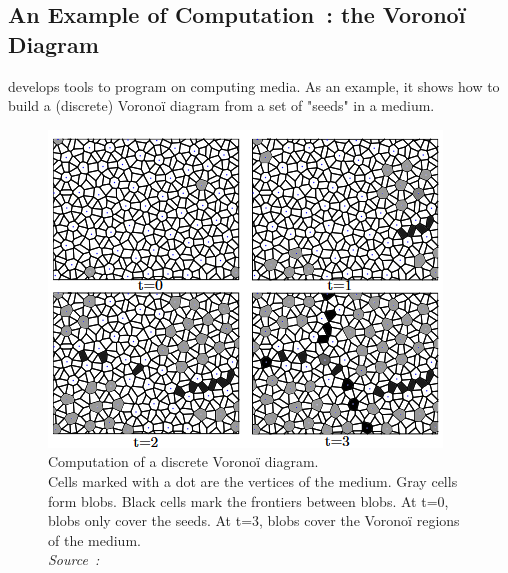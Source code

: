 \documentclass{article}
\begin{document}
\subsection{An Example of Computation~: the Voronoï Diagram}

\cite{Voronoi} develops tools to program on computing media. As an example, it shows how to build a (discrete) Voronoï diagram from a set of "seeds" in a medium.

\begin{figure}[h]
	\centering\includegraphics[width=0.7\linewidth]{assets/voronoi_spread.png}
	\caption{
		Computation of a discrete Voronoï diagram.\\
		Cells marked with a dot are the vertices of the medium.
		Gray cells form blobs. Black cells mark the frontiers between blobs. At t=0, blobs only cover the seeds. At t=3, blobs cover the Voronoï regions of the medium.\\
		\textit{Source~: \cite{Voronoi}}
	}
	\label{fig:voronoi_spread}
\end{figure}
\end{document}
